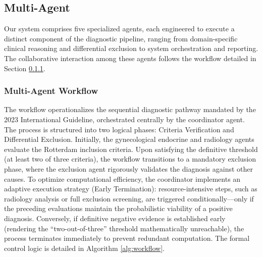 \documentclass[a4paper,fleqn]{cas-dc}
\begin{document}
\subsection{Multi-Agent}
Our system comprises five specialized agents, each engineered to execute a distinct component of the diagnostic pipeline, ranging from domain-specific clinical reasoning and differential exclusion to system orchestration and reporting. The collaborative interaction among these agents follows the workflow detailed in Section \ref{workflow}.

\subsubsection{Multi-Agent Workflow}\label{workflow}
The workflow operationalizes the sequential diagnostic pathway mandated by the 2023 International Guideline, orchestrated centrally by the coordinator agent. The process is structured into two logical phases: Criteria Verification and Differential Exclusion. Initially, the gynecological endocrine and radiology agents evaluate the Rotterdam inclusion criteria. Upon satisfying the definitive threshold (at least two of three criteria), the workflow transitions to a mandatory exclusion phase, where the exclusion agent rigorously validates the diagnosis against other causes. To optimize computational efficiency, the coordinator implements an adaptive execution strategy (Early Termination): resource-intensive steps, such as radiology analysis or full exclusion screening, are triggered conditionally—only if the preceding evaluations maintain the probabilistic viability of a positive diagnosis. Conversely, if definitive negative evidence is established early (rendering the ``two-out-of-three'' threshold mathematically unreachable), the process terminates immediately to prevent redundant computation. The formal control logic is detailed in Algorithm \ref{alg:workflow}.
\end{document}
